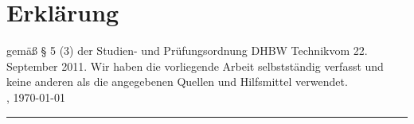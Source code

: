 \chapter*{Erklärung}
gemäß § 5 (3) der \glqq Studien- und Prüfungsordnung DHBW Technik\grqq vom 22. September 2011.
Wir haben die vorliegende Arbeit selbstständig verfasst und keine anderen als die angegebenen Quellen und Hilfsmittel verwendet.\\

\location, \today \\[4ex]
\rule[-0.2cm]{5cm}{0.5pt} \\
\textsc{\autor} \\[10ex]


%
%
%














